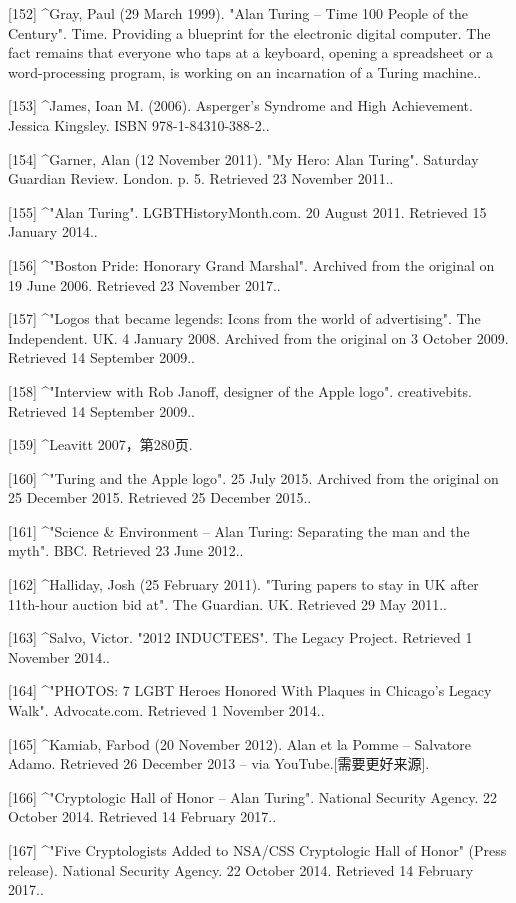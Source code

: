 [152]
^Gray, Paul (29 March 1999). "Alan Turing – Time 100 People of the Century". Time. Providing a blueprint for the electronic digital computer. The fact remains that everyone who taps at a keyboard, opening a spreadsheet or a word-processing program, is working on an incarnation of a Turing machine..

[153]
^James, Ioan M. (2006). Asperger's Syndrome and High Achievement. Jessica Kingsley. ISBN 978-1-84310-388-2..

[154]
^Garner, Alan (12 November 2011). "My Hero: Alan Turing". Saturday Guardian Review. London. p. 5. Retrieved 23 November 2011..

[155]
^"Alan Turing". LGBTHistoryMonth.com. 20 August 2011. Retrieved 15 January 2014..

[156]
^"Boston Pride: Honorary Grand Marshal". Archived from the original on 19 June 2006. Retrieved 23 November 2017..

[157]
^"Logos that became legends: Icons from the world of advertising". The Independent. UK. 4 January 2008. Archived from the original on 3 October 2009. Retrieved 14 September 2009..

[158]
^"Interview with Rob Janoff, designer of the Apple logo". creativebits. Retrieved 14 September 2009..

[159]
^Leavitt 2007，第280页.

[160]
^"Turing and the Apple logo". 25 July 2015. Archived from the original on 25 December 2015. Retrieved 25 December 2015..

[161]
^"Science & Environment – Alan Turing: Separating the man and the myth". BBC. Retrieved 23 June 2012..

[162]
^Halliday, Josh (25 February 2011). "Turing papers to stay in UK after 11th-hour auction bid at". The Guardian. UK. Retrieved 29 May 2011..

[163]
^Salvo, Victor. "2012 INDUCTEES". The Legacy Project. Retrieved 1 November 2014..

[164]
^"PHOTOS: 7 LGBT Heroes Honored With Plaques in Chicago's Legacy Walk". Advocate.com. Retrieved 1 November 2014..

[165]
^Kamiab, Farbod (20 November 2012). Alan et la Pomme – Salvatore Adamo. Retrieved 26 December 2013 – via YouTube.[需要更好来源].

[166]
^"Cryptologic Hall of Honor – Alan Turing". National Security Agency. 22 October 2014. Retrieved 14 February 2017..

[167]
^"Five Cryptologists Added to NSA/CSS Cryptologic Hall of Honor" (Press release). National Security Agency. 22 October 2014. Retrieved 14 February 2017..

